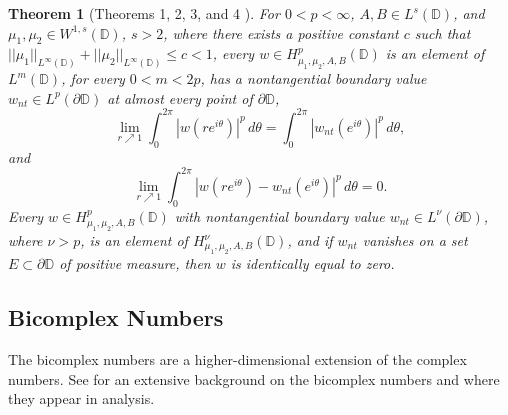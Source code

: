 \documentclass[12pt,reqno]{amsart}
\newtheorem{theorem}{Theorem}[section]
\theoremstyle{definition}
\theoremstyle{remark}
\newcommand{\p}{\partial}
\newcommand{\disk}{\mathbb{D}}
\begin{document}
%
%


 \begin{theorem}[Theorems 1, 2, 3, and 4 \cite{Klim2016}]\label{thm: gfoehardyinbetterlebesgue}\label{gofebvcon}\label{thm: gfoebvinbetterlebimpliesbetterhp}\label{thm: gfoezerobdimpliesequivzero}
             For $0 < p < \infty$, $A,B \in L^s(\disk)$, and $\mu_1,\mu_2 \in W^{1,s}(\disk)$, $s>2$, where there exists a positive constant $c$ such that $||\mu_1||_{L^\infty(\disk)}  + ||\mu_2||_{L^\infty(\disk)}\leq c < 1$, every $w \in H^{p}_{\mu_1,\mu_2,A,B}(\disk)$ is an element of $L^m(\disk)$, for every $0 < m < 2p$, has a nontangential boundary value $w_{nt} \in L^p(\partial \disk)$ at almost every point of $\p \disk$, 
        \[
            \lim_{r\nearrow 1} \int_0^{2\pi} |w(re^{i\theta})|^p \, d\theta = \int_0^{2\pi} |w_{nt}(e^{i\theta})|^p \,d\theta,
        \]
        and
        \[
            \lim_{r\nearrow 1} \int_0^{2\pi} |w(re^{i\theta})- w_{nt}(e^{i\theta})|^p \, d\theta = 0.
        \]
	Every $w \in H^p_{\mu_1, \mu_2, A, B}(\disk)$ with nontangential boundary value $w_{nt} \in L^\nu(\p \disk)$, where $\nu > p$, is an element of $H^\nu_{ \mu_1, \mu_2, A, B}(\disk)$, and if $w_{nt}$ vanishes on a set $E \subset \p \disk$ of positive measure, then $w$ is identically equal to zero. 
        \end{theorem}

         \subsection{Bicomplex Numbers}

         The bicomplex numbers are a higher-dimensional extension of the complex numbers. See \cite{PriceMulti, BCHolo, ComplexSchr, CastaKrav, BCTransmutation, BCBergman, FundBicomplex} for an extensive background on the bicomplex numbers and where they appear in analysis. 
\end{document}
